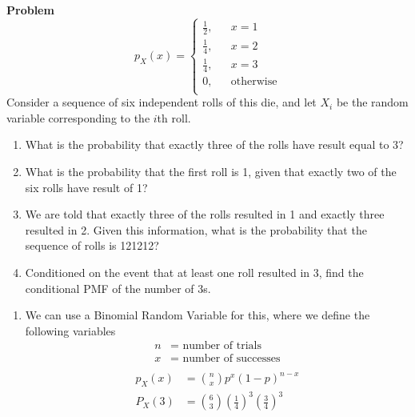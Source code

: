 \documentclass[12pt]{article}
\newenvironment{Ex}{\textbf{Problem}\vspace{.75em}\\}{}
\begin{document}
\begin{enumerate}
\begin{Ex}
\begin{equation*}
      p_X(x) = \left\{
        \begin{aligned}
          \frac{1}{2}, && x=1 \\
          \frac{1}{4}, && x=2 \\
          \frac{1}{4}, && x=3 \\
          0, && \text{otherwise} \\
        \end{aligned} \right.
    \end{equation*}
    Consider a sequence of six independent rolls of this die, and
    let $X_i$ be the random variable corresponding to the $i$th
    roll.
    \begin{enumerate}
    \item What is the probability that exactly three of the rolls
      have result equal to 3?
    \item What is the probability that the first roll is 1, given
      that exactly two of the six rolls have result of 1?
    \item We are told that exactly three of the rolls resulted in 1
      and exactly three resulted in 2. Given this information, what
      is the probability that the sequence of rolls is 121212?
    \item Conditioned on the event that at least one roll resulted
      in 3, find the conditional PMF of the number of 3s.
    \end{enumerate}
    \begin{solution} \hfill
      \begin{enumerate}
      \item We can use a Binomial Random Variable for this, where we
        define the following variables
        \begin{equation}
          \label{eq:6a-decls}
          \begin{aligned}
            n &= \text{ number of trials}\\
            x &= \text{ number of successes}\\
          \end{aligned}
        \end{equation}
        \begin{equation}
          \label{eq:6a-sol}
          \begin{aligned}
            p_X(x) &= {n \choose x}p^{x}(1-p)^{n-x} \\
            P_X(3) &= {6 \choose
              3}\left(\frac{1}{4}\right)^3\left(\frac{3}{4}\right)^3 \\

\end{aligned}
\end{equation}
\end{enumerate}
\end{solution}
\end{Ex}
\end{enumerate}
\end{document}
